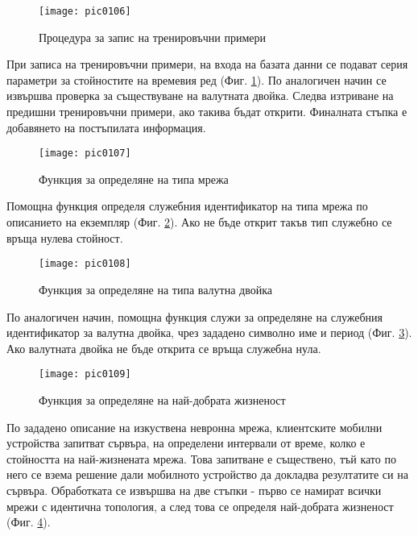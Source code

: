 \begin{figure}[h]
  \centering
  \texttt{[image: pic0106]}
  \caption{Процедура за запис на тренировъчни примери}
\label{fig:pic0106}
\end{figure}
\FloatBarrier

При записа на тренировъчни примери, на входа на базата данни се подават серия параметри за стойностите на времевия ред (Фиг. \ref{fig:pic0106}). По аналогичен начин се извършва проверка за съществуване на валутната двойка. Следва изтриване на предишни тренировъчни примери, ако такива бъдат открити. Финалната стъпка е добавянето на постъпилата информация. 

\begin{figure}[h]
  \centering
  \texttt{[image: pic0107]}
  \caption{Функция за определяне на типа мрежа}
\label{fig:pic0107}
\end{figure}
\FloatBarrier

Помощна функция определя служебния идентификатор на типа мрежа по описанието на екземпляр (Фиг. \ref{fig:pic0107}). Ако не бъде открит такъв тип служебно се връща нулева стойност. 

\begin{figure}[h]
  \centering
  \texttt{[image: pic0108]}
  \caption{Функция за определяне на типа валутна двойка}
\label{fig:pic0108}
\end{figure}
\FloatBarrier

По аналогичен начин, помощна функция служи за определяне на служебния идентификатор за валутна двойка, чрез зададено символно име и период (Фиг. \ref{fig:pic0108}). Ако валутната двойка не бъде открита се връща служебна нула. 

\begin{figure}[h]
  \centering
  \texttt{[image: pic0109]}
  \caption{Функция за определяне на най-добрата жизненост}
\label{fig:pic0109}
\end{figure}
\FloatBarrier

По зададено описание на изкуствена невронна мрежа, клиентските мобилни устройства запитват сървъра, на определени интервали от време, колко е стойността на най-жизнената мрежа. Това запитване е съществено, тъй като по него се взема решение дали мобилното устройство да докладва резултатите си на сървъра. Обработката се извършва на две стъпки - първо се намират всички мрежи с идентична топология, а след това се определя най-добрата жизненост (Фиг. \ref{fig:pic0109}).


